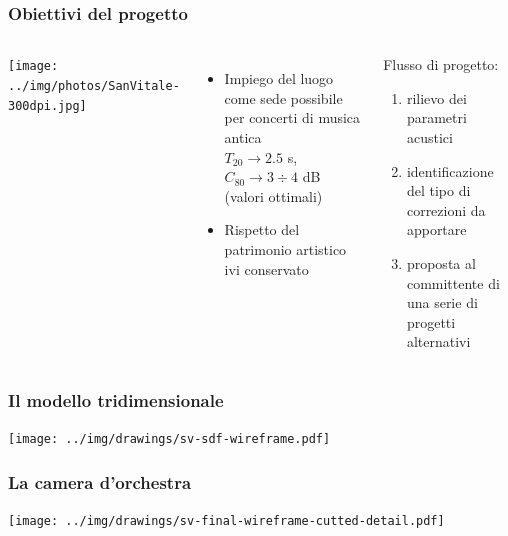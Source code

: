 \documentclass[10pt]{beamer}
\begin{document}
\begin{frame}
  \frametitle{Obiettivi del progetto}

  \begin{columns}

    \column{4.5cm}
    \texttt{[image: ../img/photos/SanVitale-300dpi.jpg]}

    \column{6cm}
    \begin{itemize}
      \item Impiego del luogo come sede possibile per concerti di musica antica\\
            $T_{20} \rightarrow 2.5$ s, $C_{80} \rightarrow 3 \div 4$ dB\\
	    (valori ottimali)
      \item Rispetto del patrimonio artistico ivi conservato
    \end{itemize}

    \pause
    \vskip 0.3cm
    \begin{block}{Flusso di progetto:}
    
      \begin{enumerate}
         \item rilievo dei parametri acustici
         \item identificazione del tipo di correzioni da apportare
         \item proposta al committente di una serie di progetti alternativi
      \end{enumerate}

    \end{block}

  \end{columns}

\end{frame}

\begin{frame}
  \frametitle{Il modello tridimensionale}

  \begin{center}
    \texttt{[image: ../img/drawings/sv-sdf-wireframe.pdf]}
  \end{center}
\end{frame}

\begin{frame}
  \frametitle{La camera d'orchestra}

  \begin{center}
    \texttt{[image: ../img/drawings/sv-final-wireframe-cutted-detail.pdf]}
  \end{center}

\end{frame}
\end{document}
